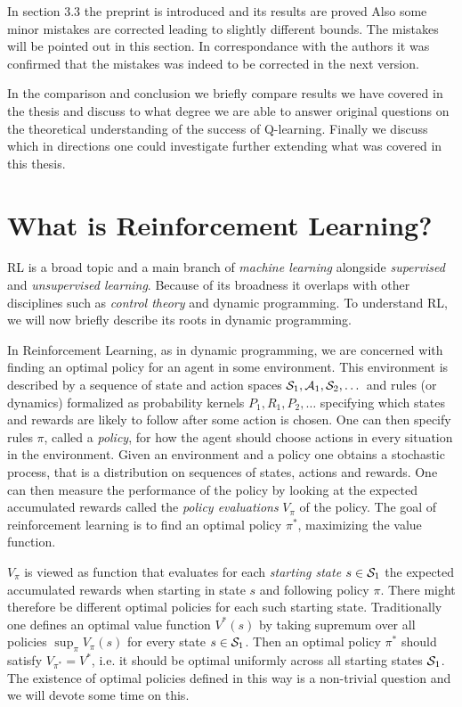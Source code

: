 In section 3.3 the preprint  is introduced
and its results are proved 
Also some minor mistakes are corrected leading to slightly
different bounds. The mistakes will be pointed out in this section.
In correspondance with the authors it was confirmed that the
mistakes was indeed to be corrected in the next version.

In the comparison and conclusion we briefly compare results we have covered
in the thesis and discuss to what degree we are able to answer original questions
on the theoretical understanding of the success of Q-learning.
Finally we discuss which in directions one could
investigate further extending what was covered in this thesis.

\section{What is Reinforcement Learning?}

RL is a broad topic and a main branch of
\emph{machine learning} alongside \emph{supervised} and \emph{unsupervised
learning}. Because of its broadness it overlaps with other disciplines
such as \emph{control theory} and dynamic programming.
To understand RL, we will now briefly describe its roots in dynamic programming.

In Reinforcement Learning, as in dynamic programming,
we are concerned with finding an optimal policy
for an agent in some environment.
This environment is described by
a sequence of state and action spaces
$\mathcal{S}_1, \mathcal{A}_1, \mathcal{S}_2, \dots$
and rules (or dynamics) formalized as probability kernels
$P_1, R_1, P_2, \dots$ specifying which states and rewards
are likely to follow after some action is chosen.
One can then specify rules $\pi$, called a \emph{policy},
for how the agent should choose actions in every situation in the environment.
Given an environment and a policy one obtains a stochastic process,
that is a distribution on sequences of states, actions and
rewards.
One can then measure the performance of the policy by looking at
the expected accumulated rewards called the \emph{policy evaluations}
$V_\pi$ of the policy.
The goal of reinforcement learning is to find an optimal policy $\pi^*$,
maximizing the value function.

$V_\pi$ is viewed as function that evaluates for each \emph{starting state}
$s \in \mathcal{S}_1$ the expected accumulated rewards when starting in state $s$
and following policy $\pi$.
There might therefore be different optimal policies for each such starting
state.
Traditionally one defines an optimal value function $V^*(s)$
by taking supremum over all policies $\sup_\pi V_\pi(s)$ for every state
$s \in \mathcal{S}_1$.
Then an optimal policy $\pi^*$ should satisfy $V_{\pi^*} = V^*$,
i.e. it should be optimal uniformly across all starting states $\mathcal{S}_1$.
The existence of optimal policies defined in this way is a non-trivial
question and we will devote some time on this.

